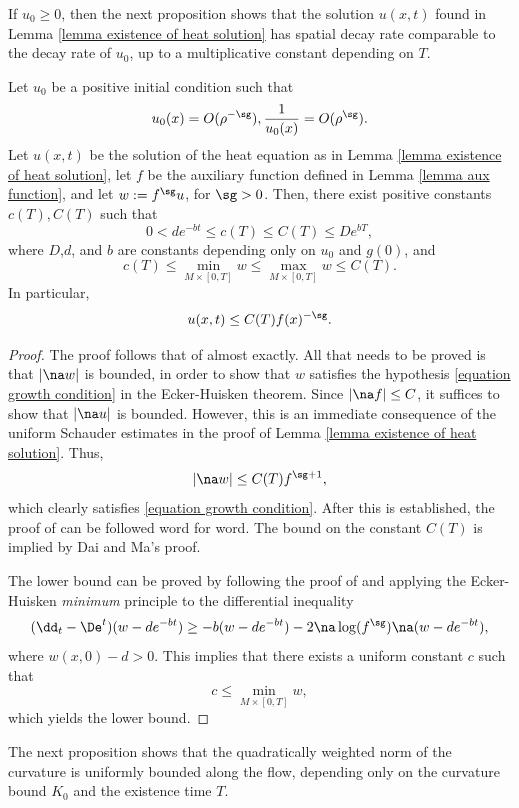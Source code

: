 \documentclass[hidelinks, 12pt, oneside, reqno]{amsart}
\begin{document}
If $u_0 \ge 0$, then the next proposition shows that the solution $u(x,t)$ found in Lemma \ref{lemma existence of heat solution} has spatial decay rate comparable to the decay rate of $u_0$, up to a multiplicative constant depending on $T$. 

\begin{prop}\label{proposition comparable decay rates}
Let $u_0$ be a positive initial condition such that 
\[
u_0(x) = O(\rho^{-\sg}), \frac{1}{u_0(x)} = O(\rho^{\sg}).
\]
Let $u(x,t)$ be the solution of the heat equation as in Lemma \ref{lemma existence of heat solution}, let $f$ be the auxiliary function defined in Lemma \ref{lemma aux function}, and let $w := f^\sg u$, for $\sg > 0$. Then, there exist positive constants $c(T), C(T)$ such that 
\[
0<de^{-bt} \le c(T) \le C(T) \le De^{bT},
\]
where $D$,$d$, and $b$ are constants depending only on $u_0$ and $g(0)$, and
\[
c(T) \le \min_{M \times [0,T]} w  \le \max_{M \times [0,T]} w \le C(T).
\]
In particular, 
\[
u(x,t) \le C(T) f(x)^{-\sg}. 
\]
\end{prop}

\begin{proof}
The proof follows that of \cite[Theorem 4]{DaiMa} almost exactly. All that needs to be proved is that $|\na w|$ is bounded, in order to show that $w$ satisfies the hypothesis \eqref{equation growth condition} in the Ecker-Huisken theorem. Since $|\na f| \le C$, it suffices to show that $|\na u|$ is bounded. However, this is an immediate consequence of the uniform Schauder estimates in the proof of Lemma \ref{lemma existence of heat solution}. Thus,
\[
|\na w| \le C(T)f^{\sg + 1},
\]
which clearly satisfies \eqref{equation growth condition}. After this is established, the proof of \cite[Theorem 4]{DaiMa} can be followed word for word. The bound on the constant $C(T)$ is implied by Dai and Ma's proof. 

The lower bound can be proved by following the proof of \cite[Theorem 4]{DaiMa} and applying the Ecker-Huisken \textit{minimum} principle to the differential inequality 
\[
    (\dd_t - \De^t)(w - de^{-bt}) \ge -b (w - de^{-bt}) - 2\na \log (f^\sg) \na (w - d e^{-bt}),
\]
where $w(x,0) - d > 0$. This implies that there exists a uniform constant $c$ such that 
\[
c \le \min_{M \times [0,T]} w,
\]
which yields the lower bound. 
\end{proof}

The next proposition shows that the quadratically weighted norm of the curvature is uniformly bounded along the flow, depending only on the curvature bound $K_0$ and the existence time $T$.
\end{document}
